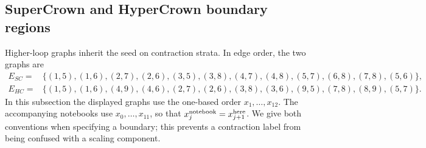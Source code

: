 \documentclass[a4paper,11pt]{article}
\begin{document}
\subsection{SuperCrown and HyperCrown boundary regions}
\label{sec:example-crown-boundaries}

Higher-loop graphs inherit the seed on contraction strata.  In edge
order, the two graphs are
\begin{align}
E_{SC}={}&\{(1,5),(1,6),(2,7),(2,6),(3,5),(3,8),
 (4,7),(4,8),(5,7),(6,8),(7,8),(5,6)\},
\nonumber\\
E_{HC}={}&\{(1,5),(1,6),(4,9),(4,6),(2,7),(2,6),
 (3,8),(3,6),(9,5),(7,8),(8,9),(5,7)\}.
\label{eq:crown-descendant-edges}
\end{align}
In this subsection the displayed graphs use the one-based order
\(x_1,\ldots,x_{12}\).  The accompanying notebooks use
\(x_0,\ldots,x_{11}\), so that
\(x_j^{\rm notebook}=x_{j+1}^{\rm here}\).  We give both conventions when
specifying a boundary; this prevents a contraction label from being confused
with a scaling component.
\end{document}
